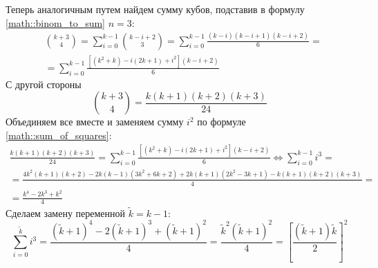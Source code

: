 \documentclass[a4paper,12pt]{article}
\begin{document}
\begin{Solution}
Теперь аналогичным путем найдем сумму кубов, подставив в формулу \ref{math::binom_to_sum} $n=3$:
\[
	\begin{split}
		& \binom{k+3}{4} = \sum_{i=0}^{k-1} \binom{k-i+2}{3} = \sum_{i=0}^{k-1} \frac{\left(k-i\right)\left(k-i+1\right)\left(k-i+2\right)}{6} = \\
		& = \sum_{i=0}^{k-1} \frac{\left[\left(k^2+k\right)-i\left(2k+1\right)+i^2\right]\left(k-i+2\right)}{6}
	\end{split}
\]
С другой стороны
\[
	\binom{k+3}{4} = \frac{k\left(k+1\right)\left(k+2\right)\left(k+3\right)}{24}
\]
Объединяем все вместе и заменяем сумму $i^2$ по формуле \ref{math::sum_of_squares}:
\begin{multline*}
	\frac{k\left(k+1\right)\left(k+2\right)\left(k+3\right)}{24} = \sum_{i=0}^{k-1} \frac{\left[\left(k^2+k\right)-i\left(2k+1\right)+i^2\right]\left(k-i+2\right)}{6} \Leftrightarrow \sum_{i=0}^{k-1} i^3 = \\
	= \frac{4k^2\left(k+1\right)\left(k+2\right)-2k\left(k-1\right)\left(3k^2+6k+2\right)+2k\left(k+1\right)\left(2k^2-3k+1\right)-k\left(k+1\right)\left(k+2\right)\left(k+3\right)}{4} = \\
	= \frac{k^4-2k^3+k^2}{4}
\end{multline*}
Сделаем замену переменной $\tilde k = k-1$:
\begin{equation}
	\sum_{i=0}^{\tilde k} i^3 = \frac{{\left(\tilde k + 1\right)}^4-2{\left(\tilde k + 1\right)}^3+{\left(\tilde k + 1\right)}^2}{4} = \frac{{\tilde k}^2{\left(\tilde k + 1\right)}^2}{4} = {\left[\frac{\left(\tilde k + 1\right)\tilde k}{2}\right]}^2
\end{equation}

\end{Solution}
\end{document}
